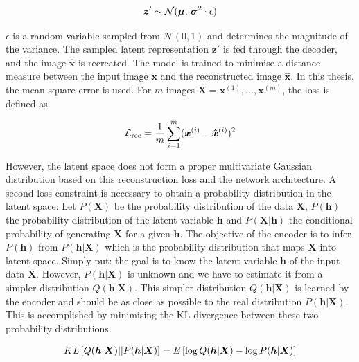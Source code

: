 \begin{align}\eqlbl{hso_1}
	\boldsymbol{z}' \sim \mathcal{N}(\boldsymbol{\mu},\,\boldsymbol{\sigma}^{2} \cdot \epsilon)
\end{align}

$\epsilon$ is a random variable sampled from  $\mathcal{N}(0, 1)$ and determines the magnitude of the variance. The sampled latent representation $\boldsymbol{z}'$ is fed through the decoder, and the image $\hat{\boldsymbol{x}}$ is recreated. The model is trained to minimise a distance measure between the input image $\boldsymbol{x}$ and the reconstructed image $\hat{\boldsymbol{x}}$. In this thesis, the mean square error is used. For $m$ images $\boldsymbol{X} = \boldsymbol{x}^{(1)}, ..., \boldsymbol{x}^{(m)}$, the loss is defined as

\begin{align}\eqlbl{hso_2}
	\mathcal{L}_{\text{rec}} = \frac{1}{m} \sum_{i=1}^{m} (\boldsymbol{x}^{(i)} - \boldsymbol{\hat{x}}^{(i)})^2
\end{align}

However, the latent space does not form a proper multivariate Gaussian distribution based on this reconstruction loss and the network architecture. A second loss constraint is necessary to obtain a probability distribution in the latent space: Let $P(\boldsymbol{X})$ be the probability distribution of the data $\boldsymbol{X}$, $P(\boldsymbol{h})$ the probability distribution of the latent variable $\boldsymbol{h}$ and $P(\boldsymbol{X}|\boldsymbol{h})$ the conditional probability of generating $\boldsymbol{X}$ for a given $\boldsymbol{h}$. The objective of the encoder is to infer $P(\boldsymbol{h})$ from $P(\boldsymbol{h}|\boldsymbol{X})$ which is the probability distribution that maps $\boldsymbol{X}$ into latent space. Simply put: the goal is to know the latent variable $\boldsymbol{h}$ of the input data $\boldsymbol{X}$.
However, $P(\boldsymbol{h}|\boldsymbol{X})$ is unknown and we have to estimate it from a simpler distribution $Q(\boldsymbol{h}|\boldsymbol{X})$. This simpler distribution $Q(\boldsymbol{h}|\boldsymbol{X})$ is learned by the encoder and should be as close as possible to the real distribution $P(\boldsymbol{h}|\boldsymbol{X})$. This is accomplished by minimising the KL divergence between these two probability distributions.

\begin{align}\eqlbl{hso_3}
	KL \left[ Q(\boldsymbol{h}|\boldsymbol{X}) || P(\boldsymbol{h}|\boldsymbol{X}) \right] = E \left[ \log Q(\boldsymbol{h}|\boldsymbol{X}) - \log P(\boldsymbol{h}|\boldsymbol{X}) \right]
\end{align}

